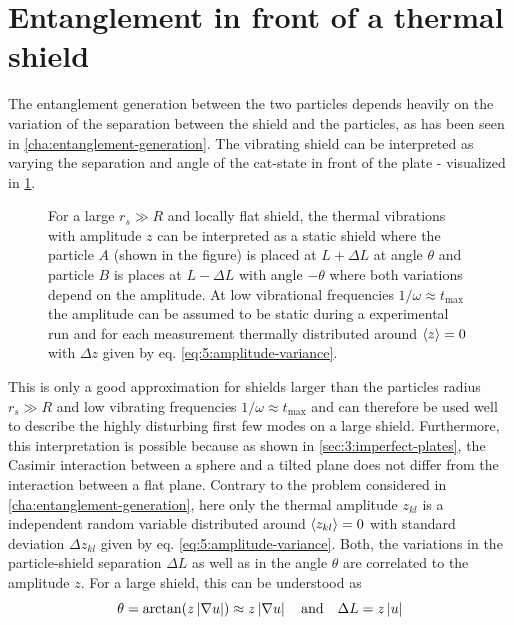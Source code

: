\section{Entanglement in front of a thermal shield}\label{sec:5:thermal-entanglement}
The entanglement generation between the two particles depends heavily on the variation of the separation between the shield and the particles, as has been seen in \cref{cha:entanglement-generation}.
The vibrating shield can be interpreted as varying the separation and angle of the cat-state in front of the plate - visualized in \cref{fig:5:vibrating-translation-to-variations}.
\begin{figure}[!htbp]
  \centering
  \def\svgwidth{\textwidth}
  
  \caption{For a large $r_s \gg R$ and locally flat shield, the thermal vibrations with amplitude $z$ can be interpreted as a static shield where the particle $A$ (shown in the figure) is placed at $L+\Delta L$ at angle $\theta$ and particle $B$ is places at $L-\Delta L$ with angle $-\theta$ where both variations depend on the amplitude. At low vibrational frequencies $1/\omega \approx t_\mathrm{max}$ the amplitude can be assumed to be static during a experimental run and for each measurement thermally distributed around $\left\langle z\right\rangle=0$ with $\Delta z$ given by eq. \eqref{eq:5:amplitude-variance}.}
  \label{fig:5:vibrating-translation-to-variations}
\end{figure}
This is only a good approximation for shields larger than the particles radius $r_s \gg R$ and low vibrating frequencies $1/\omega \approx t_\mathrm{max}$ and can therefore be used well to describe the highly disturbing first few modes on a large shield.
Furthermore, this interpretation is possible because as shown in \cref{sec:3:imperfect-plates}, the Casimir interaction between a sphere and a tilted plane does not differ from the interaction between a flat plane.
Contrary to the problem considered in \cref{cha:entanglement-generation}, here only the thermal amplitude $z_{kl}$ is a independent random variable distributed around $\left\langle z_{kl}\right\rangle = 0$ with standard deviation $\Delta z_{kl}$ given by eq. \eqref{eq:5:amplitude-variance}. 
Both, the variations in the particle-shield separation $\Delta L$ as well as in the angle $\theta$ are correlated to the amplitude $z$.
For a large shield, this can be understood as
\begin{equation}
  \theta = \arctan(z \left\lvert\nabla u\right\rvert) \approx z \left\lvert\nabla u\right\rvert \quad \text{and} \quad \Delta L = z \left\lvert u\right\rvert
\end{equation}
